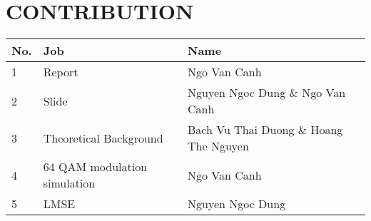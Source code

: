 \section*{CONTRIBUTION}
 {}

\begin{table}[!ht]
\begin{tabular}{|l|l|l|}
    \hline
    \textbf{No.}    & \textbf{Job}      & \textbf{Name} \\ \hline
    1 & Report & Ngo Van Canh  \\ \hline
    2 & Slide & Nguyen Ngoc Dung \& Ngo Van Canh \\ \hline
    3 & Theoretical Background & Bach Vu Thai Duong \& Hoang The Nguyen \\ \hline
    4 & 64 QAM modulation simulation & Ngo Van Canh \\ \hline
    5 & LMSE & Nguyen Ngoc Dung \\ \hline
\end{tabular}
\end{table}

\newpage